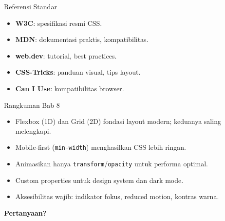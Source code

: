 \documentclass[handout]{beamer}
\begin{document}
\begin{frame}{Referensi Standar}
	\begin{itemize}
		\item \textbf{W3C}: spesifikasi resmi CSS.
		\item \textbf{MDN}: dokumentasi praktis, kompatibilitas.
		\item \textbf{web.dev}: tutorial, best practices.
		\item \textbf{CSS-Tricks}: panduan visual, tips layout.
		\item \textbf{Can I Use}: kompatibilitas browser.
	\end{itemize}
\end{frame}

\begin{frame}{Rangkuman Bab 8}
	\begin{itemize}
		\item Flexbox (1D) dan Grid (2D) fondasi layout modern; keduanya saling melengkapi.
		\item Mobile-first (\texttt{min-width}) menghasilkan CSS lebih ringan.
		\item Animasikan hanya \texttt{transform}/\texttt{opacity} untuk performa optimal.
		\item Custom properties untuk design system dan dark mode.
		\item Aksesibilitas wajib: indikator fokus, reduced motion, kontras warna.
	\end{itemize}
\end{frame}

\begin{frame}{}
	\centering
	\vfill
	\textbf{\Large Pertanyaan?}
	\vfill
\end{frame}
\end{document}
